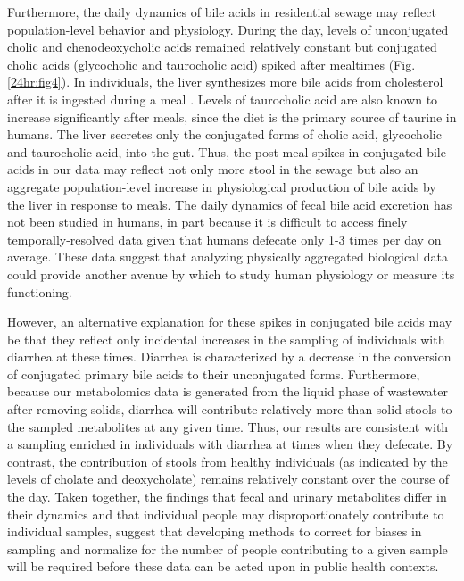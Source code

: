 Furthermore, the daily dynamics of bile acids in residential sewage may reflect population-level behavior and physiology. During the day, levels of unconjugated cholic and chenodeoxycholic acids remained relatively constant but conjugated cholic acids (glycocholic and taurocholic acid) spiked after mealtimes (Fig. \ref{24hr:fig4}). In individuals, the liver synthesizes more bile acids from cholesterol after it is ingested during a meal \cite{Hofmann1989}. Levels of taurocholic acid are also known to increase significantly after meals, since the diet is the primary source of taurine in humans. The liver secretes only the conjugated forms of cholic acid, glycocholic and taurocholic acid, into the gut. Thus, the post-meal spikes in conjugated bile acids in our data may reflect not only more stool in the sewage but also an aggregate population-level increase in physiological production of bile acids by the liver in response to meals. The daily dynamics of fecal bile acid excretion has not been studied in humans, in part because it is difficult to access finely temporally-resolved data given that humans defecate only 1-3 times per day on average. These data suggest that analyzing physically aggregated biological data could provide another avenue by which to study human physiology or measure its functioning.

However, an alternative explanation for these spikes in conjugated bile acids may be that they reflect only incidental increases in the sampling of individuals with diarrhea at these times. Diarrhea is characterized by a decrease in the conversion of conjugated primary bile acids to their unconjugated forms. Furthermore, because our metabolomics data is generated from the liquid phase of wastewater after removing solids, diarrhea will contribute relatively more than solid stools to the sampled metabolites at any given time. Thus, our results are consistent with a sampling enriched in individuals with diarrhea at times when they defecate. By contrast, the contribution of stools from healthy individuals (as indicated by the levels of cholate and deoxycholate) remains relatively constant over the course of the day. Taken together, the findings that fecal and urinary metabolites differ in their dynamics and that individual people may disproportionately contribute to individual samples, suggest that developing methods to correct for biases in sampling and normalize for the number of people contributing to a given sample will be required before these data can be acted upon in public health contexts.

